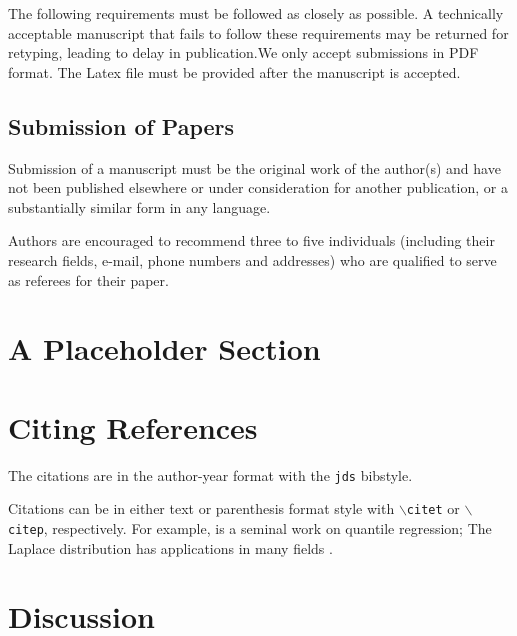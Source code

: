 \documentclass[letterpaper,inpress]{jdsart}
\begin{document}
The following requirements must be followed as closely as possible. A
technically acceptable manuscript that fails to follow these requirements may be
returned for retyping, leading to delay in publication.We only accept
submissions in PDF format. The Latex file must be provided after the manuscript
is accepted.

\hypertarget{submission-of-papers}{%
\subsection{Submission of Papers}\label{submission-of-papers}}

Submission of a manuscript must be the original work of the author(s) and have
not been published elsewhere or under consideration for another publication, or
a substantially similar form in any language.

Authors are encouraged to recommend three to five individuals (including their
research fields, e-mail, phone numbers and addresses) who are qualified to serve
as referees for their paper.

\hypertarget{a-placeholder-section}{%
\section{A Placeholder Section}\label{a-placeholder-section}}

\lipsum[4-7]

\hypertarget{citing-references}{%
\section{Citing References}\label{citing-references}}

The citations are in the author-year format with the
\texttt{jds} bibstyle.

Citations can be in either text or parenthesis format style with
\texttt{$\backslash$citet} or \texttt{$\backslash$citep},
respectively. For example, \citet{KoenkerBassett1978} is a seminal
work on quantile regression; The Laplace distribution has applications
in many fields \citep{Kotz2001}.

\hypertarget{discussion}{%
\section{Discussion}\label{discussion}}

\lipsum[1-3]



\end{document}
